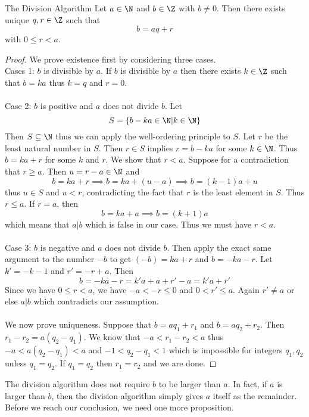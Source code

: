 \begin{thm}{The Division Algorithm}{} Let $a\in\N$ and $b\in\Z$ with $b\neq 0$. Then there exists unique $q,r\in\Z$ such that $$b=aq+r$$ with $0\leq r<a$. \tcbline
\begin{proof}
We prove existence first by considering three cases. \\
Cases 1: $b$ is divisible by $a$.  If $b$ is divisible by $a$ then there exists $k\in\Z$ such that $b=ka$ thus $k=q$ and $r=0$. \\~\\
Case 2: $b$ is positive and $a$ does not divide $b$. Let $$S=\{b-ka\in\N|k\in\N\}$$ Then $S\subseteq\N$ thus we can apply the well-ordering principle to $S$. Let $r$ be the least natural number in $S$. Then $r\in S$ implies $r=b-ka$ for some $k\in\N$. Thus $b=ka+r$ for some $k$ and $r$. We show that $r<a$. Suppose for a contradiction that $r\geq a$. Then $u=r-a\in\N$ and $$b=ka+r\implies b=ka+(u-a)\implies b=(k-1)a+u$$ thus $u\in S$ and $u<r$, contradicting the fact that $r$ is the least element in $S$. Thus $r\leq a$. If $r=a$, then $$b=ka+a\implies b=(k+1)a$$ which means that $a|b$ which is false in our case. Thus we must have $r<a$. \\~\\
Case 3: $b$ is negative and $a$ does not divide $b$. Then apply the exact same argument to the number $-b$ to get $(-b)=ka+r$ and $b=-ka-r$. Let $k'=-k-1$ and $r'=-r+a$. Then $$b=-ka-r=k'a+a+r'-a=k'a+r'$$ Since we have $0\leq r<a$, we have $-a<-r\leq 0$ and $0<r'\leq a$. Again $r'\neq a$ or else $a|b$ which contradicts our assumption. \\~\\
We now prove uniqueness. Suppose that $b=aq_1+r_1$ and $b=aq_2+r_2$. Then $r_1-r_2=a(q_2-q_1)$. We know that $-a<r_1-r_2<a$ thus $-a<a(q_2-q_1)<a$ and $-1<q_2-q_1<1$ which is impossible for integers $q_1,q_2$ unless $q_1=q_2$. If $q_1=q_2$ then $r_1=r_2$ and we are done. 
\end{proof}
\end{thm}

The division algorithm does not require $b$ to be larger than $a$. In fact, if $a$ is larger than $b$, then the division algorithm simply gives $a$ itself as the remainder. Before we reach our conclusion, we need one more proposition. 

